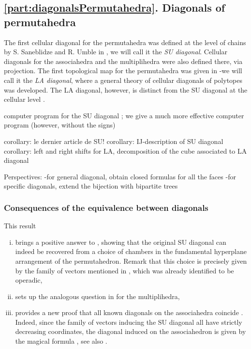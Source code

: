 \documentclass{amsart}
\theoremstyle{definition}
\newcommand{\SU}{\mathrm{SU}}
\begin{document}

\subsection*{\cref{part:diagonalsPermutahedra}. Diagonals of permutahedra}

The first cellular diagonal for the permutahedra was defined at the level of chains by S. Saneblidze and R. Umble in \cite{SaneblidzeUmble}, we will call it the \emph{SU diagonal}. 
Cellular diagonals for the associahedra and the multiplihedra were also defined there, via projection. 
The first topological map for the permutahedra was given in \cite{LaplanteAnfossi} -we will call it the \emph{LA diagonal}, where a general theory of cellular diagonals of polytopes was developed. 
The LA diagonal, however, is distinct from the SU diagonal at the cellular level \cite[Rem.~3.19]{LaplanteAnfossi}. 

computer program for the SU diagonal \cite{VejdemoJohansson}; we give a much more effective computer program (however, without the signs)

corollary: le dernier article de SU!
corollary: IJ-description of SU diagonal
corollary: left and right shifts for LA, decomposition of the cube associated to LA diagonal

Perspectives: 
-for general diagonal, obtain closed formulas for all the faces
-for specific diagonals, extend the bijection with bipartite trees

\subsubsection{Consequences of the equivalence between diagonals}


This result
\begin{enumerate}[i)]
	\item brings a positive answer to \cite[Rem.~2.19]{LaplanteAnfossi}, showing that the original $\SU$ diagonal can indeed be recovered from a choice of chambers in the fundamental hyperplane arrangement of the permutahedron. 
	Remark that this choice is precisely given by the family of vectors mentioned in \cite[Rem.~4.19]{LaplanteAnfossi}, which was already identified to be operadic,
	\item sets up the analogous question in \cite[Rem.~3.9]{LaplanteAnfossiMazuir} for the multiplihedra,
	\item provides a new proof that all known diagonals on the associahedra coincide \cite{SaneblidzeUmble-comparingDiagonals}.
	Indeed, since the family of vectors inducing the $\SU$ diagonal all have strictly decreasing coordinates, the diagonal induced on the associahedron is given by the magical formula \cite[Thm.~2]{MasudaThomasTonksVallette}, see also \cite[Prop.~3.8]{LaplanteAnfossi}.
\end{enumerate}
\end{document}
